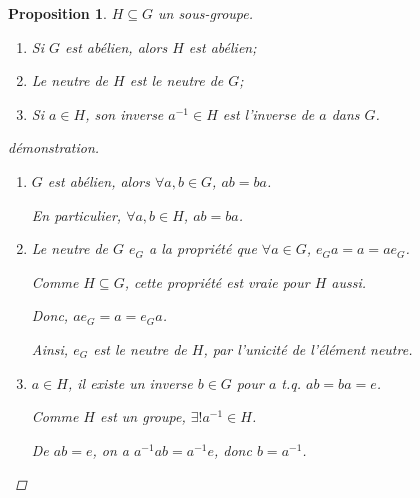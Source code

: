 \documentclass{report}
\newtheorem*{prop}{Proposition}
\theoremstyle{definition}
\theoremstyle{remark}
\begin{document}
	\begin{prop}
		$H \subseteq G$ un sous-groupe.
		\begin{enumerate}[label=(\alph*),itemsep=1pt]
			\item Si $G$ est ab\'elien, alors $H$ est ab\'elien;
			\item Le neutre de $H$ est le neutre de $G$;
			\item Si $a \in H$, son inverse $a^{-1}\in H$ est l'inverse de $a$ dans $G$.
		\end{enumerate}
		\begin{proof}[d\'emonstration]~

			\begin{enumerate}[label=(\alph*),itemsep=1pt]
				\item $G$ est ab\'elien, alors $\forall a,b \in G$, $ab=ba$.

				En particulier, $\forall a,b \in H$, $ab=ba$.
				\item Le neutre de $G$ $e_G$ a la propri\'et\'e que $\forall a \in G$, $e_Ga=a=ae_G$.

				Comme $H \subseteq G$, cette propri\'et\'e est vraie pour $H$ aussi.

				Donc, $ae_G=a=e_Ga$.

				Ainsi, $e_G$ est le neutre de $H$, par l'unicit\'e de l'\'el\'ement neutre.
				\item $a \in H$, il existe un inverse $b \in G$ pour $a$ t.q. $ab=ba=e$.

				Comme $H$ est un groupe, $\exists! a^{-1} \in H$.

				De $ab=e$, on a $a^{-1}ab=a^{-1}e$, donc $b=a^{-1}$.
			\end{enumerate}
		\end{proof}
	\end{prop}
\end{document}
